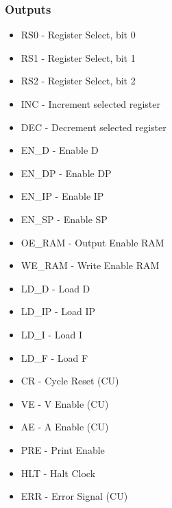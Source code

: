 \subsubsection*{Outputs}
\begin{itemize}
\item RS0 - Register Select, bit 0
\item RS1 - Register Select, bit 1
\item RS2 - Register Select, bit 2
\item INC - Increment selected register
\item DEC - Decrement selected register
\item EN\_D - Enable D
\item EN\_DP - Enable DP
\item EN\_IP - Enable IP
\item EN\_SP - Enable SP
\item OE\_RAM - Output Enable RAM
\item WE\_RAM - Write Enable RAM
\item LD\_D - Load D
\item LD\_IP - Load IP
\item LD\_I - Load I
\item LD\_F - Load F
\item CR - Cycle Reset (CU)
\item VE - V Enable (CU)
\item AE - A Enable (CU)
\item PRE - Print Enable
\item HLT - Halt Clock
\item ERR - Error Signal (CU)
\end{itemize}


